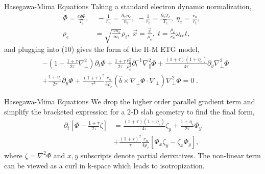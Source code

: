 \documentclass[aspectratio=43]{beamer}
\begin{document}
   \begin{frame}{Hasegawa-Mima Equations}
      \quad Taking a standard electron dynamic normalization,
      \begin{equation}
      \begin{aligned}
         \Phi    = \frac{e\delta\Phi}{T_i},&\; -\frac{1}{r_n}=\frac{\partial_x n_e}{n_e},\; -\frac{1}{r_t}=\frac{\partial_x T_e}{T_e},\; \eta_e=\frac{r_n}{r_t},\; \\
         \rho_e &= \sqrt{\frac{\tau m_e}{m_i}}\rho_i,\; \vec{x} = \frac{\vec{x}}{\rho_e},\; t=\frac{\rho_e}{r_n}\omega_{ce}t,
      \end{aligned}
      \end{equation}
   and plugging into (10) gives the form of the H-M ETG model,
      \begin{equation}
      \begin{aligned}
         &-(1-\frac{1+\tau}{2\tau}\nabla_{\perp}^2)\partial_t\Phi + \frac{1+\tau}{2\tau}\frac{r_n^2}{\rho_e^2}\partial_t^{-1}\nabla_{\parallel}^2\Phi
          + \frac{(1+\tau)(1+\eta_e)}{4\tau}\partial_y\nabla_{\perp}^2\Phi \\
         &+ \frac{1+\eta_e}{2\tau}\partial_y\Phi + \frac{(1+\tau)^2}{\tau^2}\frac{r_n}{4\rho_e}(\hat{b}\times\nabla_{\perp}\Phi\cdot\nabla_{\perp})\nabla_{\perp}^2\Phi = 0\;.
      \end{aligned}
      \end{equation}
   \end{frame}

   \begin{frame}{Hasegawa-Mima Equations}
      \quad We drop the higher order parallel gradient term and simplify the bracketed expression for a 2-D slab geometry to find the final
   form,
      \begin{equation}
      \begin{aligned}
         \partial_t[\Phi-\frac{1+\tau}{2\tau}\zeta] &= \frac{(1+\tau)(1+\eta_e)}{4\tau}\zeta_y + \frac{1+\eta_e}{2\tau}\Phi_y \\
                                                    &+ \frac{(1+\tau)^2}{\tau}\frac{r_n}{4\rho_e}[\Phi_x\zeta_y-\zeta_x\Phi_y],
      \end{aligned}
      \end{equation}
   where $\zeta = \nabla^2\Phi$ and $x,y$ subscripts denote partial derivatives. The non-linear term can be viewed as a curl in k-space which leads to isotropization.
   \end{frame}
\end{document}

